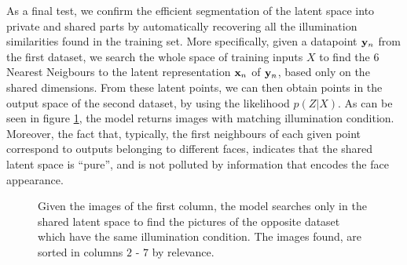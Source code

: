 \par As a final test, we confirm the efficient segmentation of the
latent space into private and shared parts by automatically recovering
all the illumination similarities found in the training set.  More
specifically, given a datapoint $\mathbf{y}_n$ from the first dataset, we
search the whole space of training inputs $X$ to find the $6$ Nearest
Neigbours to the latent representation $\mathbf{x}_n$ of $\mathbf{y}_n$, based
only on the shared dimensions.
 From these latent points, we can then obtain points in the output
 space of the second dataset, by using the likelihood $p(Z | X)$.  As
 can be seen in figure \ref{fig:yale6SetsGrouping}, the model returns
 images with matching illumination condition.  Moreover, the fact
 that, typically, the first neighbours of each given point correspond
 to outputs belonging to different faces, indicates that the shared
 latent space is ``pure'', and is not polluted by information that
 encodes the face appearance.
\begin{figure}[ht]
\begin{center}
 \vspace{-16pt}
 \newline
{}
 \vspace{-16pt}
 \newline
{}
 \vspace{-16pt}
 \newline
{}
 \vspace{-16pt}
 \newline
\end{center}
\vspace{-7pt}
\caption{
Given the images of the first column, the model searches only in the shared latent space to find the pictures of the opposite dataset
which have the same illumination condition. The images found, are sorted in columns
$2$ - $7$ by relevance.
}
\label{fig:yale6SetsGrouping}
\vspace{-8pt}
\end{figure}

